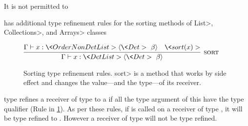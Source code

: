 It is not permitted to 




\TheDeterminismChecker has additional type refinement rules for the sorting
methods of \<List>, \<Collections>, and \<Arrays> classes
\begin{figure}
%     
    
  $\infer[\rulename{sort}]
  {\Gamma \vdash x : \<Det List>\angles{\<Det>\ \beta}}
  {\Gamma \vdash x : \<OrderNonDet List>\angles{\<Det>\ \beta} & \<sort(x)>}$
    
%     
    
    \caption{Sorting type refinement rules.  \<sort> is a method that works
    by side effect and changes the value---and the type---of its receiver.}
    \label{fig-sorting}
\end{figure}
\TheDeterminismChecker type refines a receiver of type  to a  if all the
type argument of this  have the type qualifier  (Rule  in \cref{fig-sorting}).
As per these rules, if  is called on a receiver of type , it will
be type refined to . However a receiver of type  will not be type refined.

